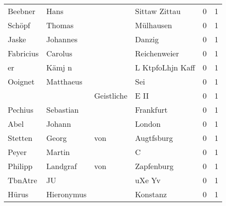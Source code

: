 \begin{tabular}{llllrr}
                  Beebner &                               Hans &             &                               Sittaw Zittau &          0 &         1 \\
                   Schöpf &                             Thomas &             &                                   Mülhausen &          0 &         1 \\
                    Jaske &                           Johannes &             &                                      Danzig &          0 &         1 \\
                Fabricius &                            Carolus &             &                                Reichenweier &          0 &         1 \\
                       er &                             Kämj n &             &                            L KtpfoLhjn Kaff &          0 &         1 \\
                  Ooignet &                          Matthaeus &             &                                         Sei &          0 &         1 \\
                          &                                    &  Geistliche &                                        E II &          0 &         1 \\
                  Pechius &                          Sebastian &             &                                   Frankfurt &          0 &         1 \\
                     Abel &                             Johann &             &                                      London &          0 &         1 \\
                  Stetten &                              Georg &         von &                                  Augtfsburg &          0 &         1 \\
                    Peyer &                             Martin &             &                                           C &          0 &         1 \\
                  Philipp &                           Landgraf &         von &                                  Zapfenburg &          0 &         1 \\
                  TbnAtre &                                 JU &             &                                      uXe Yv &          0 &         1 \\
                    Hürus &                         Hieronymus &             &                                    Konstanz &          0 &         1 \\

\end{tabular}
